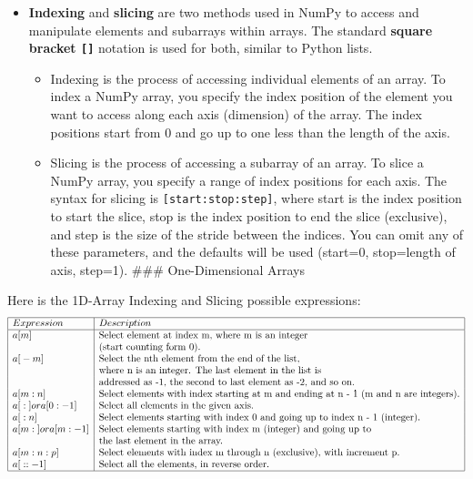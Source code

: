 \documentclass[11pt]{article}
\providecommand{\tightlist}{%
      \setlength{\itemsep}{0pt}\setlength{\parskip}{0pt}}
\begin{document}
\begin{itemize}
\tightlist
\item
  \textbf{Indexing} and \textbf{slicing} are two methods used in NumPy
  to access and manipulate elements and subarrays within arrays. The
  standard \textbf{square bracket \texttt{{[}{]}}} notation is used for
  both, similar to Python lists.

  \begin{itemize}
  \tightlist
  \item
    Indexing is the process of accessing individual elements of an
    array. To index a NumPy array, you specify the index position of the
    element you want to access along each axis (dimension) of the array.
    The index positions start from 0 and go up to one less than the
    length of the axis.
  \item
    Slicing is the process of accessing a subarray of an array. To slice
    a NumPy array, you specify a range of index positions for each axis.
    The syntax for slicing is \texttt{{[}start:stop:step{]}}, where
    start is the index position to start the slice, stop is the index
    position to end the slice (exclusive), and step is the size of the
    stride between the indices. You can omit any of these parameters,
    and the defaults will be used (start=0, stop=length of axis,
    step=1). \#\#\# One-Dimensional Arrays
  \end{itemize}
\end{itemize}

Here is the 1D-Array Indexing and Slicing possible expressions:
$$
\begin{array}{|l|l|}
\hline
Expression&Description\\
\hline
a{[}m{]} & \text{Select element at index m, where m is an integer}\\ 
& \text{(start counting form 0).} \\
a{[}-m{]} & \text{Select the nth element from the end of the list,}\\ 
& \text{where n is an integer. The last element in the list is}\\ 
& \text{addressed as -1, the second to last element as -2, and so on.} \\
a{[}m:n{]} & \text{Select elements with index starting at m and ending at n -
1 (m and n are integers).} \\
a{[}:{]} or a{[}0:-1{]} & \text{Select all elements in the given axis.} \\
a{[}:n{]} & \text{Select elements starting with index 0 and going up to index
n - 1 (integer).} \\
a{[}m:{]} or a{[}m:-1{]} & \text{Select elements starting with index m
(integer) and going up to }\\ 
& \text{the last element in the array.} \\
a{[}m:n:p{]} & \text{Select elements with index m through n (exclusive), with
increment p.} \\
a{[}::-1{]} & \text{Select all the elements, in reverse order.} \\
\hline
\end{array}
$$
\end{document}
